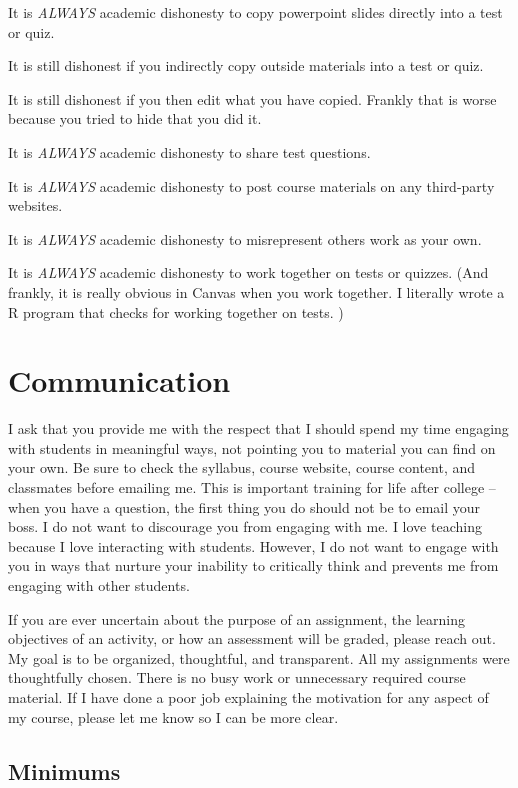 It is \emph{ALWAYS} academic dishonesty to copy powerpoint slides directly into a test or quiz.

It is still dishonest if you indirectly copy outside materials into a test or quiz.

It is still dishonest if you then edit what you have copied. Frankly that is worse because you tried to hide that you did it.

It is \emph{ALWAYS} academic dishonesty to share test questions.

It is \emph{ALWAYS} academic dishonesty to post course materials on any third-party websites.

It is \emph{ALWAYS} academic dishonesty to misrepresent others work as your own.

It is \emph{ALWAYS} academic dishonesty to work together on tests or quizzes.
(And frankly, it is really obvious in Canvas when you work together.
I literally wrote a R program that checks for working together on tests. )

\hypertarget{communication}{%
\chapter{Communication}\label{communication}}

I ask that you provide me with the respect that I should spend my time engaging with students in meaningful ways, not pointing you to material you can find on your own. Be sure to check the syllabus, course website, course content, and classmates before emailing me. This is important training for life after college -- when you have a question, the first thing you do should not be to email your boss. I do not want to discourage you from engaging with me. I love teaching because I love interacting with students. However, I do not want to engage with you in ways that nurture your inability to critically think and prevents me from engaging with other students.

If you are ever uncertain about the purpose of an assignment, the learning objectives of an activity, or how an assessment will be graded, please reach out. My goal is to be organized, thoughtful, and transparent. All my assignments were thoughtfully chosen. There is no busy work or unnecessary required course material. If I have done a poor job explaining the motivation for any aspect of my course, please let me know so I can be more clear.

\hypertarget{minimums}{%
\section{Minimums}\label{minimums}}

